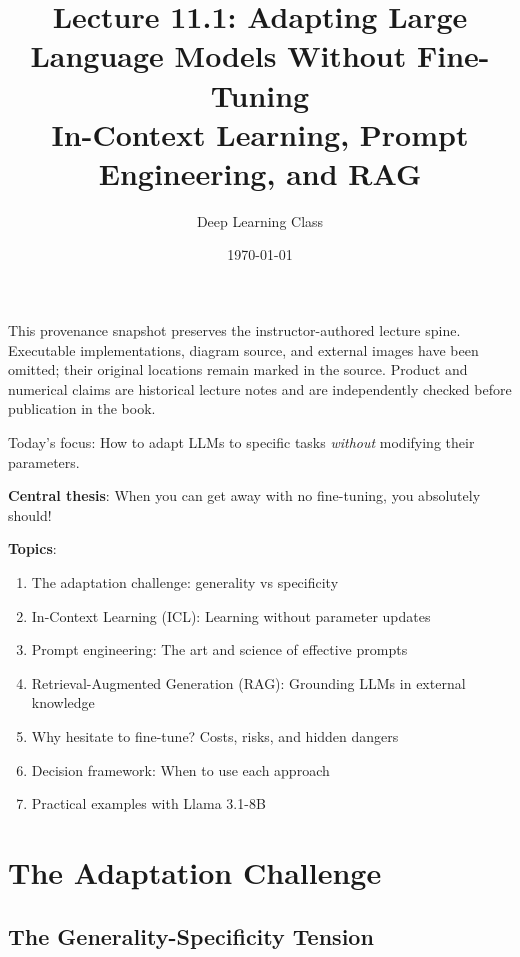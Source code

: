 \documentclass{article}
\title{Lecture 11.1: Adapting Large Language Models Without Fine-Tuning\\
In-Context Learning, Prompt Engineering, and RAG}
\author{Deep Learning Class}
\date{\today}
\begin{document}
\maketitle

\begin{tcolorbox}[colback=gray!5!white, colframe=gray!60!black, title=Public Snapshot Boundary]
This provenance snapshot preserves the instructor-authored lecture spine. Executable
implementations, diagram source, and external images have been omitted; their original
locations remain marked in the source. Product and numerical claims are historical
lecture notes and are independently checked before publication in the book.
\end{tcolorbox}

\begin{tcolorbox}[colback=blue!5!white, colframe=blue!75!black, title=Lecture Overview]
Today's focus: How to adapt LLMs to specific tasks \textit{without} modifying their parameters.

\textbf{Central thesis}: When you can get away with no fine-tuning, you absolutely should!

\textbf{Topics}:
\begin{enumerate}
\item The adaptation challenge: generality vs specificity
\item In-Context Learning (ICL): Learning without parameter updates
\item Prompt engineering: The art and science of effective prompts
\item Retrieval-Augmented Generation (RAG): Grounding LLMs in external knowledge
\item Why hesitate to fine-tune? Costs, risks, and hidden dangers
\item Decision framework: When to use each approach
\item Practical examples with Llama 3.1-8B
\end{enumerate}
\end{tcolorbox}

\section{The Adaptation Challenge}

\subsection{The Generality-Specificity Tension}
\end{document}
